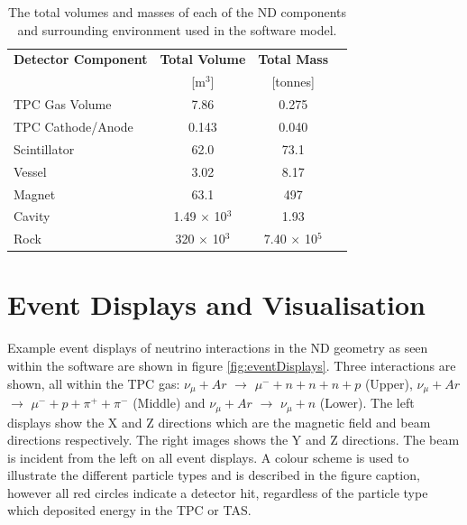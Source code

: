 \begin{table}[h]
\centering
\begin{tabular}{lccc}
	\hline
	\textbf{Detector Component} & \textbf{Total Volume} & \textbf{Total Mass} \\
	& [m$^{3}$] & [tonnes]  \\
	\hline
	TPC Gas Volume & 7.86 & 0.275\\
	TPC Cathode/Anode & 0.143 & 0.040\\
	Scintillator	 & 62.0 & 73.1 \\
	Vessel & 3.02 & 8.17 \\
	Magnet & 63.1 & 497\\
	Cavity & 1.49 $\times$ 10$^{3}$ & 1.93 \\
	Rock & 320 $\times$ 10$^{3}$ & 7.40 $\times$ 10$^{5}$ \\
	\hline
\end{tabular}
\caption{The total volumes and masses of each of the ND components and surrounding environment used in the software model.}
\label{tab:ndMatPara2}
\end{table}

\section{Event Displays and Visualisation}
Example event displays of neutrino interactions in the ND geometry as seen within the software are shown in figure \ref{fig:eventDisplays}. Three interactions are shown, all within the TPC gas: $\nu_{\mu} + Ar$ $\rightarrow$ $\mu^{-} + n + n + n + p$ (Upper), $\nu_{\mu} + Ar$ $\rightarrow$ $\mu^{-} + p + \pi^{+} + \pi^{-}$ (Middle) and $\nu_{\mu} + Ar$ $\rightarrow$ $\nu_{\mu} + n$ (Lower). The left displays show the X and Z directions which are the magnetic field and beam directions respectively. The right images shows the Y and Z directions. The beam is incident from the left on all event displays. A colour scheme is used to illustrate the different particle types and is described in the figure caption, however all red circles indicate a detector hit, regardless of the particle type which deposited energy in the TPC or TAS.

